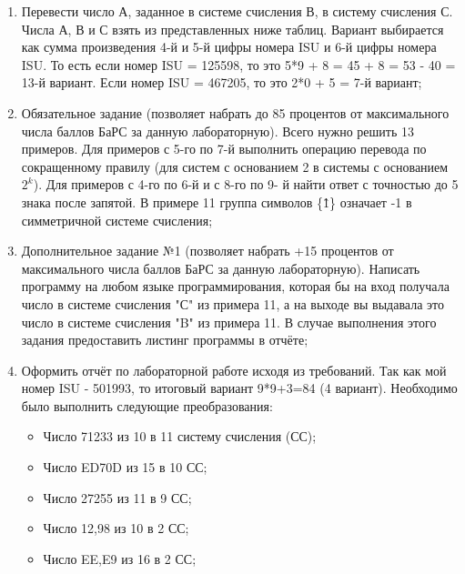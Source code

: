 \documentclass[14pt,final,oneside]{extreport}%
\begin{document}
    \begin{enumerate}
        \setlength{\itemsep}{0pt} %
        \setlength{\parskip}{0pt}
        \setlength{\parsep}{0pt}
        \item Перевести число А, заданное в системе счисления В, в систему
            счисления С. Числа А, В и С взять из представленных ниже
            таблиц. Вариант выбирается как сумма произведения 4-й и 5-й цифры номера ISU и 6-й цифры номера ISU. То есть если номер ISU = 125598, то это 5*9 + 8 = 45 + 8 = 53 - 40 = 13-й вариант. Если номер ISU = 467205, то это 2*0 + 5 = 7-й вариант;
        \item Обязательное задание (позволяет набрать до 85 процентов от
            максимального числа баллов БаРС за данную лабораторную). Всего
            нужно решить 13 примеров. Для примеров с 5-го по 7-й выполнить
            операцию перевода по сокращенному правилу (для систем с основанием
            2 в системы с основанием ${2^k}$). Для примеров с 4-го по 6-й и с 8-го по 9-
            й найти ответ с точностью до 5 знака после запятой. В примере 11 группа
            символов \{\^1\} означает -1 в симметричной системе счисления;
        \item Дополнительное задание №1 (позволяет набрать +15 процентов от
            максимального числа баллов БаРС за данную лабораторную). Написать
            программу на любом языке программирования, которая бы на вход
            получала число в системе счисления "С" из примера 11, а на выходе вы
            выдавала это число в системе счисления "B" из примера 11. В случае
            выполнения этого задания предоставить листинг программы в отчёте;
        \item Оформить отчёт по лабораторной работе исходя из требований.
        Так как мой номер ISU - 501993, то итоговый вариант 9*9+3=84 (4 вариант).
        Необходимо было выполнить следующие преобразования:
        \begin{itemize}
            \setlength{\itemsep}{0pt} %
            \setlength{\parskip}{0pt}
            \setlength{\parsep}{0pt}
            \item Число 71233 из 10 в 11 систему счисления (СС);
            \item Число ED70D из 15 в 10 СС;
            \item Число 27255 из 11 в 9 СС;
            \item Число 12,98 из 10 в 2 СС;
            \item Число EE,E9 из 16 в 2 СС;

\end{itemize}
\end{enumerate}
\end{document}
